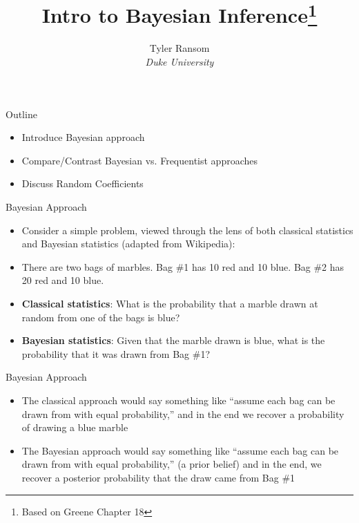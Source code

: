 \documentclass[english,xcolor=dvipsnames]{beamer}
\begin{document}
\begin{frame}
\title{Intro to Bayesian Inference\thanks{Based on Greene Chapter 18}}
\author{
	Tyler Ransom\\
	\emph{Duke University}\\
}
\titlepage
\end{frame}

\begin{frame}{Outline}
\begin{itemize}
	\item Introduce Bayesian approach
	\item Compare/Contrast Bayesian vs. Frequentist approaches
	\item Discuss Random Coefficients
\end{itemize}
\end{frame}

\begin{frame}{Bayesian Approach}
\begin{itemize}
	\item Consider a simple problem, viewed through the lens of both classical statistics and Bayesian statistics (adapted from Wikipedia):
	\item There are two bags of marbles. Bag \#1 has 10 red and 10 blue. Bag \#2 has 20 red and 10 blue.
	\item \textbf{Classical statistics}: What is the probability that a marble drawn at random from one of the bags is blue?
	\item \textbf{Bayesian statistics}: Given that the marble drawn is blue, what is the probability that it was drawn from Bag \#1?
\end{itemize}
\end{frame}

\begin{frame}{Bayesian Approach}
\begin{itemize}
	\item The classical approach would say something like ``assume each bag can be drawn from with equal probability,'' and in the end we recover a probability of drawing a blue marble 
	\item The Bayesian approach would say something like ``assume each bag can be drawn from with equal probability,'' (a prior belief) and in the end, we recover a posterior probability that the draw came from Bag \#1
\end{itemize}
\end{frame}
\end{document}
